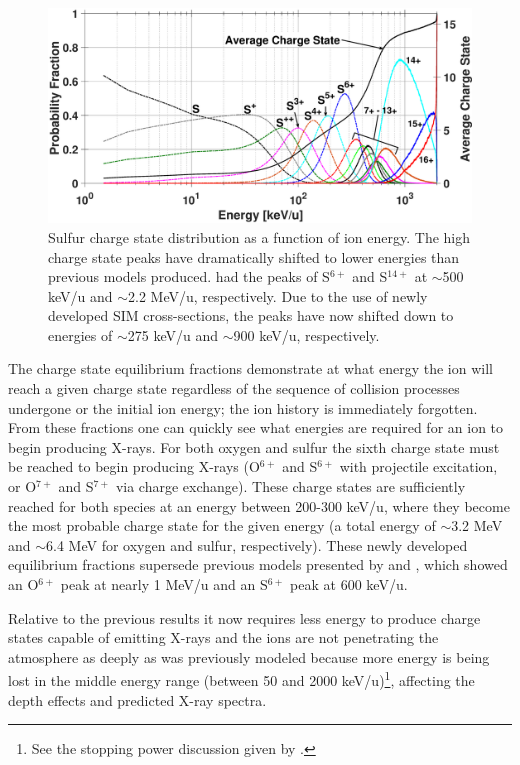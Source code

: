 \documentclass[draft]{agujournal2018}
\begin{document}
\begin{figure}
    \centering
    \includegraphics[width=\textwidth]{Figures/CSDsul.eps}
    \caption{Sulfur charge state distribution as a function of ion energy. The high charge state peaks have dramatically shifted to lower energies than previous models produced. \citet{ozak2010} had the peaks of S$^{6+}$ and S$^{14+}$ at $\sim$500 keV/u and $\sim$2.2 MeV/u, respectively. Due to the use of newly developed SIM cross-sections, the peaks have now shifted down to energies of $\sim$275 keV/u and $\sim$900 keV/u, respectively.}
    \label{fig:CSDsul}
\end{figure}

The charge state equilibrium fractions demonstrate at what energy the ion will reach a given charge state regardless of the sequence of collision processes undergone or the initial ion energy; the ion history is immediately forgotten.
From these fractions one can quickly see what energies are required for an ion to begin producing X-rays.
For both oxygen and sulfur the sixth charge state must be reached to begin producing X-rays (O$^{6+}$ and S$^{6+}$ with projectile excitation, or O$^{7+}$ and S$^{7+}$ via charge exchange).
These charge states are sufficiently reached for both species at an energy between 200-300 keV/u, where they become the most probable charge state for the given energy (a total energy of $\sim$3.2 MeV and $\sim$6.4 MeV for oxygen and sulfur, respectively).
These newly developed equilibrium fractions supersede previous models presented by \citet{ozak2010} and \citet{houston2018}, which showed an O$^{6+}$ peak at nearly 1 MeV/u and an S$^{6+}$ peak at 600 keV/u.

Relative to the previous results it now requires less energy to produce charge states capable of emitting X-rays and the ions are not penetrating the atmosphere as deeply as was previously modeled because more energy is being lost in the middle energy range (between 50 and 2000 keV/u)\footnote{See the stopping power discussion given by \citet{schultz2019}.}, affecting the depth effects and predicted X-ray spectra.
\end{document}
